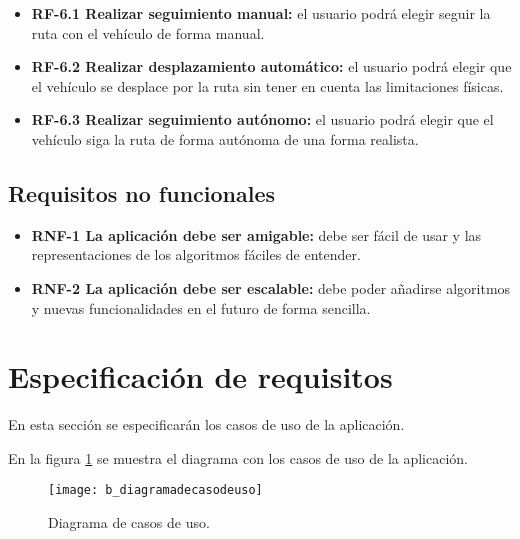 \begin{itemize}
  \begin{itemize}
  \tightlist
  \item \textbf{RF-6.1 Realizar seguimiento manual:} el usuario podrá elegir seguir la ruta con el vehículo de forma manual.
  
  \item \textbf{RF-6.2 Realizar desplazamiento automático:} el usuario podrá elegir que el vehículo se desplace por la ruta sin tener en cuenta las limitaciones físicas.
  
  \item \textbf{RF-6.3 Realizar seguimiento autónomo:} el usuario podrá elegir que el vehículo siga la ruta de forma autónoma de una forma realista.

  \end{itemize}
  
\end{itemize}

\subsection{Requisitos no funcionales}

\begin{itemize}
\tightlist

\item \textbf{RNF-1 La aplicación debe ser amigable:} debe ser fácil de usar y las representaciones de los algoritmos fáciles de entender.
  
\item \textbf{RNF-2 La aplicación debe ser escalable:} debe poder añadirse algoritmos y nuevas funcionalidades en el futuro de forma sencilla.

\end{itemize}

\newpage
\section{Especificación de requisitos}
En esta sección se especificarán los casos de uso de la aplicación.

En la figura \ref{fig:diagramadecasodeuso} se muestra el diagrama con los casos de uso de la aplicación.

\begin{figure}[htpb]
    \centering
    \texttt{[image: b\_diagramadecasodeuso]}
    \caption[Diagrama de casos de uso]{Diagrama de casos de uso.}
    \label{fig:diagramadecasodeuso}
\end{figure}

